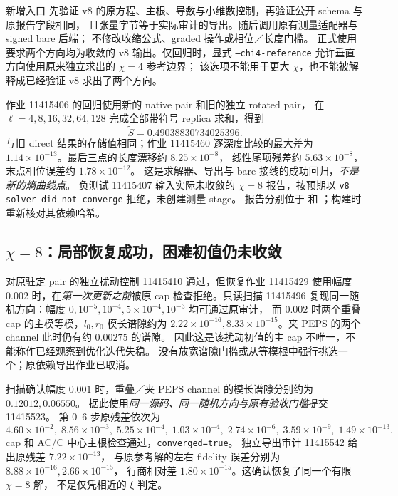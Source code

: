 \documentclass[11pt]{article}
\newcommand{\tS}{\widetilde S}
\newcommand{\code}[1]{{\small\texttt{#1}}}
\begin{document}
新增入口 
先验证 v8 的原方程、主根、导数与小维数控制，再验证公开 schema 与原报告字段相同，
且张量字节等于实际审计的导出。随后调用原有测量适配器与 signed bare 后端；
不修改收缩公式、graded 操作或相位／长度门槛。
正式使用要求两个方向均为收敛的 v8 输出。仅回归时，显式
\code{--chi4-reference} 允许垂直方向使用原来独立求出的 $\chi=4$ 参考边界；
该选项不能用于更大 $\chi$，也不能被解释成已经验证 v8 求出了两个方向。

作业 11415406 的回归使用新的 native pair 和旧的独立 rotated pair，
在 $\ell=4,8,16,32,64,128$ 完成全部带符号 replica 求和，得到
\begin{equation}
 \tS=0.49038830734025396.
\end{equation}
与旧 direct 结果的存储值相同；作业 11415460 逐深度比较的最大差为
$1.14\times10^{-13}$。最后三点的长度漂移约 $8.25\times10^{-8}$，
线性尾项残差约 $5.63\times10^{-8}$，末点相位误差约 $1.78\times10^{-12}$。
这是求解器、导出与 bare 接线的成功回归，\emph{不是新的熵曲线点}。
负测试 11415407 输入实际未收敛的 $\chi=8$ 报告，按预期以
\code{v8 solver did not converge} 拒绝，未创建测量 stage。
报告分别位于  和
；构建时重新核对其依赖哈希。

\subsection{\texorpdfstring{$\chi=8$}{χ=8}：局部恢复成功，困难初值仍未收敛}
对原驻定 pair 的独立扰动控制 11415410 通过，但恢复作业 11415429 使用幅度
$0.002$ 时，在\emph{第一次更新之前}被原 cap 检查拒绝。只读扫描 11415496
复现同一随机方向：幅度 $0,10^{-5},10^{-4},5\times10^{-4},10^{-3}$ 均可通过原审计，
而 $0.002$ 时两个重叠 cap 的主模等模，$l_0,r_0$ 模长谱隙约为
$2.22\times10^{-16},8.33\times10^{-15}$。夹 PEPS 的两个 channel 此时仍有约 $0.00275$ 的谱隙。
因此这是该扰动初值的主 cap 不唯一，不能称作已经观察到优化迭代失稳。
没有放宽谱隙门槛或从等模根中强行挑选一个；原依赖导出作业已取消。

扫描确认幅度 $0.001$ 时，重叠／夹 PEPS channel 的模长谱隙分别约为 $0.12012,0.06550$。
据此使用\emph{同一源码、同一随机方向与原有验收门槛}提交 11415523。
第 0--6 步原残差依次为
\begin{equation}
 4.60\times10^{-2},\;8.56\times10^{-3},\;5.25\times10^{-4},\;
 1.03\times10^{-4},\;2.74\times10^{-6},\;3.59\times10^{-9},\;1.49\times10^{-13}.
\end{equation}
cap 和 AC/C 中心主根检查通过，\code{converged=true}。
独立导出审计 11415542 给出原残差 $7.22\times10^{-13}$，
与原参考解的左右 fidelity 误差分别为 $8.88\times10^{-16},2.66\times10^{-15}$，
行商相对差 $1.80\times10^{-15}$。这确认恢复了同一个有限 $\chi=8$ 解，
不是仅凭相近的 $\xi$ 判定。
\end{document}
